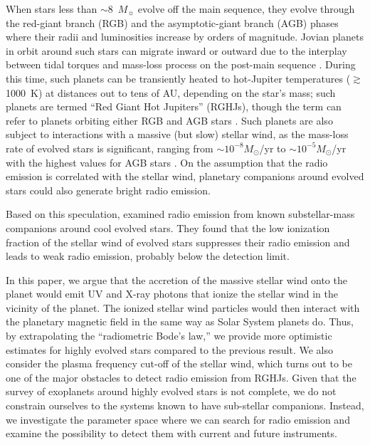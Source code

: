 \documentclass[iop,numberedappendix,apj]{emulateapj}
\begin{document}
When stars less than $\sim$8~$M_\sun$ evolve off the main sequence, they evolve through the red-giant branch (RGB) and the asymptotic-giant branch (AGB) phases where their radii and luminosities increase by orders of magnitude.
Jovian planets in orbit around such stars can migrate inward or outward due to the interplay between tidal torques and mass-loss process on the post-main sequence \citep{nordhaus_et_al2010, spiegel2012, mustill+villaver2012, nordhaus+spiegel2013}.
During this time, such planets can be transiently heated to hot-Jupiter temperatures ($\gtrsim$1000~K) at distances out to tens of AU, depending on the star's mass; such planets are termed ``Red Giant Hot Jupiters'' (RGHJs), though the term can refer to planets orbiting either RGB and AGB stars \citep{spiegel+madhusudhan2012}.
Such planets are also subject to interactions with a massive (but slow) stellar wind, as the mass-loss rate of evolved stars is significant, ranging from $\sim 10^{-8} M_\odot$/yr to $\sim  10^{-5} M_\odot$/yr with the highest values for AGB stars \citep[e.g.,][]{reimers1975, schild1989, vassiliadis1993, schoier2001, vanloon2005}. 
On the assumption that the radio emission is correlated with the stellar wind, planetary companions around evolved stars could also generate bright radio emission. 

Based on this speculation, \citet{ignace2010} examined radio emission from known substellar-mass companions around cool evolved stars.
They found that the low ionization fraction of the stellar wind of evolved stars suppresses their radio emission and leads to weak radio emission, probably below the detection limit. 

In this paper, we argue that the accretion of the massive stellar wind onto the planet would emit UV and X-ray photons that ionize the stellar wind in the vicinity of the planet.
The ionized stellar wind particles would then interact with the planetary magnetic field in the same way as Solar System planets do.
Thus, by extrapolating the ``radiometric Bode's law,'' we provide more optimistic estimates for highly evolved stars compared to the previous result.
We also consider the plasma frequency cut-off of the stellar wind, which turns out to be one of the major obstacles to detect radio emission from RGHJs. 
Given that the survey of exoplanets around highly evolved stars is not complete, we do not constrain ourselves to the systems known to have sub-stellar companions.
Instead, we investigate the parameter space where we can search for radio emission and examine the possibility to detect them with current and future instruments. 
\end{document}
